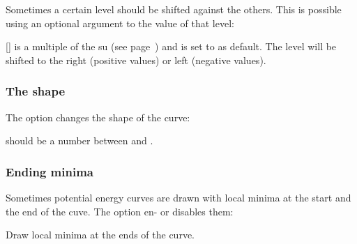 \documentclass[load-preamble+]{cnltx-doc}
\begin{document}
Sometimes a certain level should be shifted against the others.  This is
possible using an optional argument to the value of that level:
\begin{commands}
  []
     is a multiple of the \ac{su} (see page~\pageref{key:unit})
    and is set to  as default. The level will be shifted to the right
    (positive values) or left (negative values).
\end{commands}
\begin{example}
  \begin{endiagram}
  \end{endiagram}
  \quad
  \begin{endiagram}
  \end{endiagram}
  \quad
  \begin{endiagram}
  \end{endiagram}
\end{example}

\subsubsection{The shape}

The option  changes the shape of the curve:
\begin{options}
     should be a number between  and .
\end{options}

\begin{example}
  \begin{endiagram}
  \end{endiagram}
  \quad
  \begin{endiagram}
  \end{endiagram}
  \quad
  \begin{endiagram}
  \end{endiagram}
\end{example}

\subsubsection{Ending minima}

Sometimes potential energy curves are drawn with local minima at the start and
the end of the cuve.  The option  en- or disables them:
\begin{options}
    Draw local minima at the ends of the curve.
\end{options}
\end{document}
